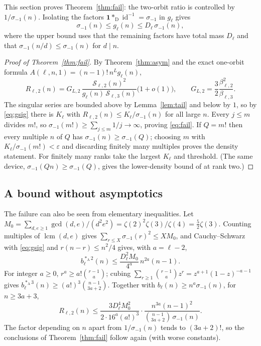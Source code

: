 \documentclass[11pt,a4paper]{article}
\theoremstyle{remark}
\numberwithin{equation}{section}
\newcommand{\Sing}{\mathcal S}
\newcommand{\id}{\operatorname{id}}
\newcommand{\lcm}{\operatorname{lcm}}
\newcommand{\Dc}{*_{\mathrm D}}
\newcommand{\Ac}{*_{\mathrm A}}
\newcommand{\one}{\mathbf 1}
\begin{document}
This section proves Theorem~\ref{thm:fail}: the two-orbit ratio is controlled by $1/\sigma_{-1}(n)$. Isolating the factors $\one\Dc\id^{-1}=\sigma_{-1}$ in $g_\ell$ gives
\begin{equation}\label{eq:gsig}
\sigma_{-1}(n)\le g_\ell(n)\le D_\ell\,\sigma_{-1}(n),
\end{equation}
where the upper bound uses that the remaining factors have total mass $D_\ell$ and that $\sigma_{-1}(n/d)\le\sigma_{-1}(n)$ for $d\mid n$.

\begin{proof}[Proof of Theorem~\ref{thm:fail}]
By Theorem~\ref{thm:asym} and the exact one-orbit formula $A(\ell,n,1)=(n-1)!\,n^{L}g_\ell(n)$,
\begin{equation}\label{eq:R2}
R_{\ell,2}(n)=G_{L,2}\,\frac{\Sing_{\ell,2}(n)^2}{g_\ell(n)\,\Sing_{\ell,3}(n)}\bigl(1+o(1)\bigr),\qquad G_{L,2}=\frac32\frac{\beta_{\ell,2}^2}{\beta_{\ell,3}} .
\end{equation}
The singular series are bounded above by Lemma~\ref{lem:tail} and below by $1$, so by \eqref{eq:gsig} there is $K_\ell$ with $R_{\ell,2}(n)\le K_\ell/\sigma_{-1}(n)$ for all large $n$. Every $j\le m$ divides $m!$, so $\sigma_{-1}(m!)\ge\sum_{j\le m}1/j\to\infty$, proving \eqref{eq:fail}. If $Q=m!$ then every multiple $n$ of $Q$ has $\sigma_{-1}(n)\ge\sigma_{-1}(Q)$; choosing $m$ with $K_\ell/\sigma_{-1}(m!)<\varepsilon$ and discarding finitely many multiples proves the density statement. For finitely many ranks take the largest $K_\ell$ and threshold. (The same device, $\sigma_{-1}(Qn)\ge\sigma_{-1}(Q)$, gives the lower-density bound of \cite{CHS2026} at rank two.)
\end{proof}

\subsection{A bound without asymptotics}
The failure can also be seen from elementary inequalities. Let $M_0=\sum_{d,e\ge1}\gcd(d,e)/(d^2e^2)=\zeta(2)^2\zeta(3)/\zeta(4)=\tfrac52\zeta(3)$. Counting multiples of $\lcm(d,e)$ gives $\sum_{r\le X}\sigma_{-1}(r)^2\le XM_0$, and Cauchy--Schwarz with \eqref{eq:gsig} and $r(n-r)\le n^2/4$ gives, with $a=\ell-2$,
\[
b_\ell^{\Ac2}(n)\le\frac{D_\ell^2M_0}{4^a}\,n^{2a}(n-1).
\]
For integer $a\ge0$, $r^a\ge a!\binom{r-1}{a}$; cubing $\sum_{r\ge1}\binom{r-1}{a}z^r=z^{a+1}(1-z)^{-a-1}$ gives $b_\ell^{\Ac3}(n)\ge(a!)^3\binom{n-1}{3a+2}$. Together with $b_\ell(n)\ge n^a\sigma_{-1}(n)$, for $n\ge3a+3$,
\begin{equation}\label{eq:elem}
R_{\ell,2}(n)\le\frac{3D_\ell^4M_0^2}{2\cdot16^a(a!)^3}\cdot\frac{n^{3a}(n-1)^2}{\binom{n-1}{3a+2}\,\sigma_{-1}(n)} .
\end{equation}
The factor depending on $n$ apart from $1/\sigma_{-1}(n)$ tends to $(3a+2)!$, so the conclusions of Theorem~\ref{thm:fail} follow again (with worse constants).
\end{document}
